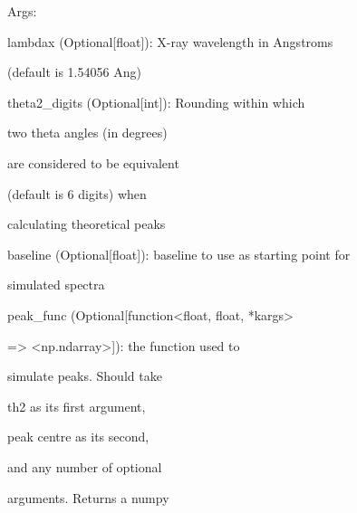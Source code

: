 \documentclass[letterpaper,10pt,english]{sphinxmanual}
\begin{document}
\begin{fulllineitems}
\begin{DUlineblock}{0em}
\item[] Args:
\item[]
\begin{DUlineblock}{\DUlineblockindent}
\item[]
\begin{DUlineblock}{\DUlineblockindent}
\item[] lambdax (Optional{[}float{]}): X-ray wavelength in Angstroms
\item[]
\begin{DUlineblock}{\DUlineblockindent}
\item[] (default is 1.54056 Ang)
\end{DUlineblock}
\item[] theta2\_digits (Optional{[}int{]}): Rounding within which
\item[]
\begin{DUlineblock}{\DUlineblockindent}
\item[] two theta angles (in degrees)
\item[] are considered to be equivalent
\item[] (default is 6 digits) when
\item[] calculating theoretical peaks
\end{DUlineblock}
\end{DUlineblock}
\item[] baseline (Optional{[}float{]}): baseline to use as starting point for
\item[]
\begin{DUlineblock}{\DUlineblockindent}
\item[] simulated spectra
\end{DUlineblock}
\item[] peak\_func (Optional{[}function\textless{}float, float, *kargs\textgreater{}
\item[]
\begin{DUlineblock}{\DUlineblockindent}
\item[] =\textgreater{} \textless{}np.ndarray\textgreater{}{]}): the function used to
\item[]
\begin{DUlineblock}{\DUlineblockindent}
\item[] simulate peaks. Should take
\item[] th2 as its first argument,
\item[] peak centre as its second,
\item[] and any number of optional
\item[] arguments. Returns a numpy

\end{DUlineblock}
\end{DUlineblock}
\end{DUlineblock}
\end{DUlineblock}
\end{fulllineitems}
\end{document}
